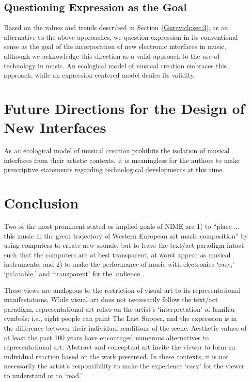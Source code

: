 \subsection{Questioning Expression as the Goal}
\label{Gurevich:sub:5_4}
Based on the values and trends described in Section~\ref{Gurevich:sec:3}, as an alternative to the above approaches, we question expression in its conventional sense as the goal of the incorporation of new electronic interfaces in music, although we acknowledge this direction as a valid approach to the use of technology in music. An ecological model of musical creation embraces this approach, while an expression-centered model denies its validity.

\section{Future Directions for the Design of New Interfaces}

As an ecological model of musical creation prohibits the isolation of musical interfaces from their artistic contexts, it is meaningless for the authors to make prescriptive statements regarding technological developments at this time.

\section{Conclusion}

Two of the most prominent stated or implied goals of NIME are 1) to ``place ... this music in the great trajectory of Western European art music composition'' \cite{Taylor:2001} by using computers to create new sounds, but to leave the text/act paradigm intact such that the computers are at best transparent, at worst appear as musical instruments; and 2) to make the performance of music with electronics `easy,' `palatable,' and `transparent' for the audience \cite{Fels:2002}.

These views are analogous to the restriction of visual art to its representational manifestations. While visual art does not necessarily follow the text/act paradigm, representational art relies on the artist's `interpretation' of familiar symbols; i.e., eight people can paint The Last Supper, and the expression is in the difference between their individual renditions of the scene. Aesthetic values of at least the past 100 years have encouraged numerous alternatives to representational art. Abstract and conceptual art invite the viewer to form an individual reaction based on the work presented. In these contexts, it is not necessarily the artist's responsibility to make the experience `easy' for the viewer to understand or to `read.'

